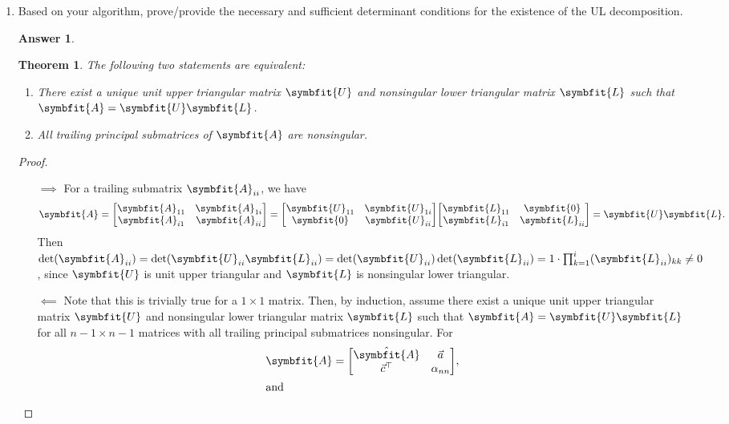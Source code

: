 \documentclass{article}
\newtheorem{theorem}{Theorem}
\theoremstyle{definition}
\newtheorem*{answer}{Answer}
\newcommand{\mat}[1]{\symbfit{#1}}
\begin{document}
\begin{enumerate}[leftmargin=\labelsep]
\begin{enumerate}
		      \item Based on your algorithm, prove/provide the necessary and sufficient determinant conditions for the existence of the UL decomposition.
		            \begin{answer}
			            \begin{theorem}
				            The following two statements are equivalent:
				            \begin{enumerate}
					            \item There exist a unique unit upper triangular matrix \(\mat{U}\) and nonsingular lower triangular matrix \(\mat{L}\) such that \(\mat{A} = \mat{U}\mat{L}\).
					            \item All trailing principal submatrices of \(\mat{A}\) are nonsingular.
				            \end{enumerate}
			            \end{theorem}
			            \begin{proof}\hfill
				            \begin{itemize}
					            \item[\(\implies\)] For a trailing submatrix \(\mat{A}_{ii}\), we have
					                  \[
						                  \mat{A} = \mqty[\mat{A}_{11}&\mat{A}_{1i}\\\mat{A}_{i1}&\mat{A}_{ii}] = \mqty[\mat{U}_{11}&\mat{U}_{1i}\\\mat{0}&\mat{U}_{ii}] \mqty[\mat{L}_{11}&\mat{0}\\\mat{L}_{i1}&\mat{L}_{ii}] = \mat{U}\mat{L}.
					                  \]
					                  Then \(\det(\mat{A}_{ii}) = \det(\mat{U}_{ii}\mat{L}_{ii}) = \det(\mat{U}_{ii})\det(\mat{L}_{ii}) = 1 \cdot \prod_{k=1}^i (\mat{L}_{ii})_{kk} \neq 0\), since \(\mat{U}\) is unit upper triangular and \(\mat{L}\) is nonsingular lower triangular.
					            \item[\(\impliedby\)] Note that this is trivially true for a \(1 \times 1\) matrix. Then, by induction, assume there exist a unique unit upper triangular matrix \(\mat{U}\) and nonsingular lower triangular matrix \(\mat{L}\) such that \(\mat{A} = \mat{U}\mat{L}\) for all \(n-1 \times n-1\) matrices with all trailing principal submatrices nonsingular. For
					                  \begin{align*}
						                  \mat{A}       & = \mqty[\hat{\mat{A}} & \vec{a} \\\vec{c}^\top & \alpha_{nn}],               \\
						                  \shortintertext{and}

\end{align*}
\end{itemize}
\end{proof}
\end{answer}
\end{enumerate}
\end{enumerate}
\end{document}
